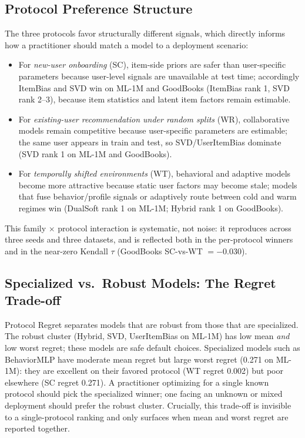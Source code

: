\documentclass[journal]{IEEEtran}
\begin{document}
\subsection{Protocol Preference Structure}
The three protocols favor structurally different signals, which directly informs how a practitioner should match a model to a deployment scenario:
\begin{itemize}
    \item For \emph{new-user onboarding} (SC), item-side priors are safer than user-specific parameters because user-level signals are unavailable at test time; accordingly ItemBias and SVD win on ML-1M and GoodBooks (ItemBias rank 1, SVD rank 2--3), because item statistics and latent item factors remain estimable.
    \item For \emph{existing-user recommendation under random splits} (WR), collaborative models remain competitive because user-specific parameters are estimable; the same user appears in train and test, so SVD/UserItemBias dominate (SVD rank 1 on ML-1M and GoodBooks).
    \item For \emph{temporally shifted environments} (WT), behavioral and adaptive models become more attractive because static user factors may become stale; models that fuse behavior/profile signals or adaptively route between cold and warm regimes win (DualSoft rank 1 on ML-1M; Hybrid rank 1 on GoodBooks).
\end{itemize}
This family $\times$ protocol interaction is systematic, not noise: it reproduces across three seeds and three datasets, and is reflected both in the per-protocol winners and in the near-zero Kendall $\tau$ (GoodBooks SC-vs-WT $= -0.030$).

\subsection{Specialized vs.\ Robust Models: The Regret Trade-off}
Protocol Regret separates models that are robust from those that are specialized. The robust cluster (Hybrid, SVD, UserItemBias on ML-1M) has low mean \emph{and} low worst regret; these models are safe default choices. Specialized models such as BehaviorMLP have moderate mean regret but large worst regret (0.271 on ML-1M): they are excellent on their favored protocol (WT regret 0.002) but poor elsewhere (SC regret 0.271). A practitioner optimizing for a single known protocol should pick the specialized winner; one facing an unknown or mixed deployment should prefer the robust cluster. Crucially, this trade-off is invisible to a single-protocol ranking and only surfaces when mean and worst regret are reported together.
\end{document}
